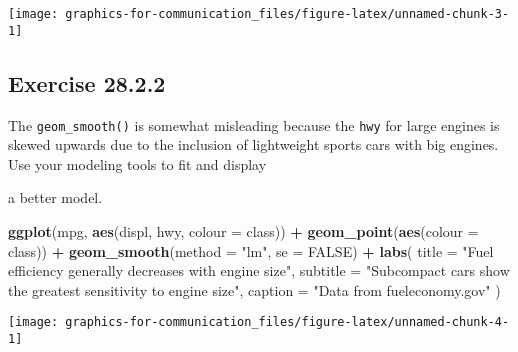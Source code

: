 \documentclass[]{book}
\newenvironment{Shaded}{\begin{snugshade}}{\end{snugshade}}
\newcommand{\DataTypeTok}[1]{\textcolor[rgb]{0.13,0.29,0.53}{#1}}
\newcommand{\KeywordTok}[1]{\textcolor[rgb]{0.13,0.29,0.53}{\textbf{#1}}}
\newcommand{\NormalTok}[1]{#1}
\newcommand{\OperatorTok}[1]{\textcolor[rgb]{0.81,0.36,0.00}{\textbf{#1}}}
\newcommand{\OtherTok}[1]{\textcolor[rgb]{0.56,0.35,0.01}{#1}}
\newcommand{\StringTok}[1]{\textcolor[rgb]{0.31,0.60,0.02}{#1}}
\theoremstyle{plain}
\theoremstyle{remark}
\theoremstyle{definition}
\theoremstyle{definition}
\theoremstyle{definition}
\theoremstyle{remark}
\begin{document}
\begin{center}\texttt{[image: graphics-for-communication\_files/figure-latex/unnamed-chunk-3-1]} \end{center}

\hypertarget{exercise-28.2.2}{%
\subsection*{\texorpdfstring{Exercise
{28.2.2}}{Exercise 28.2.2}}\label{exercise-28.2.2}}

The \texttt{geom\_smooth()} is somewhat misleading because the
\texttt{hwy} for large engines is skewed upwards due to the inclusion of
lightweight sports cars with big engines. Use your modeling tools to fit
and display

a better model.

\begin{Shaded}
\begin{Highlighting}[]
\KeywordTok{ggplot}\NormalTok{(mpg, }\KeywordTok{aes}\NormalTok{(displ, hwy, }\DataTypeTok{colour =}\NormalTok{ class)) }\OperatorTok{+}
\StringTok{  }\KeywordTok{geom_point}\NormalTok{(}\KeywordTok{aes}\NormalTok{(}\DataTypeTok{colour =}\NormalTok{ class)) }\OperatorTok{+}
\StringTok{  }\KeywordTok{geom_smooth}\NormalTok{(}\DataTypeTok{method =} \StringTok{"lm"}\NormalTok{, }\DataTypeTok{se =} \OtherTok{FALSE}\NormalTok{) }\OperatorTok{+}
\StringTok{  }\KeywordTok{labs}\NormalTok{(}
    \DataTypeTok{title =} \StringTok{"Fuel efficiency generally decreases with engine size"}\NormalTok{,}
    \DataTypeTok{subtitle =} \StringTok{"Subcompact cars show the greatest sensitivity to engine size"}\NormalTok{,}
    \DataTypeTok{caption =} \StringTok{"Data from fueleconomy.gov"}
\NormalTok{  )}
\end{Highlighting}
\end{Shaded}

\begin{center}\texttt{[image: graphics-for-communication\_files/figure-latex/unnamed-chunk-4-1]} \end{center}
\end{document}
